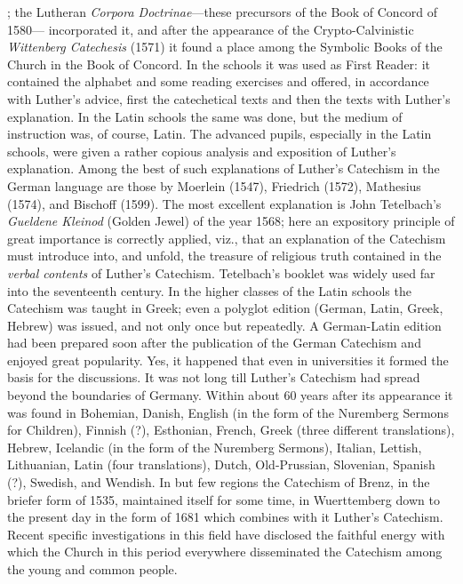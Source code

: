 ; the Lutheran \emph{Corpora Doctrinae}—these precursors of the Book of Concord of 1580— incorporated it, and after the appearance of the Crypto-Calvinistic \emph{Wittenberg Catechesis} (1571) it found a place among the Symbolic Books of the Church in the Book of Concord. In the schools it was used as First Reader: it contained the alphabet and some reading exercises and offered, in accordance with Luther’s advice, first the catechetical texts and then the texts with Luther’s explanation. In the Latin schools the same was done, but the medium of instruction was, of course, Latin. The advanced pupils, especially in the Latin schools, were given a rather copious analysis and exposition of Luther’s explanation. Among the best of such explanations of Luther’s Catechism in the German language are those by Moerlein (1547), Friedrich (1572), Mathesius (1574), and Bischoff (1599). The most excellent explanation is John Tetelbach’s \emph{Gueldene Kleinod} (Golden Jewel) of the year 1568; here an expository principle of great importance is correctly applied, viz., that an explanation of the Catechism must introduce into, and unfold, the treasure of religious truth contained in the \emph{verbal contents} of Luther’s Catechism. Tetelbach’s booklet was widely used far into the seventeenth century. In the higher classes of the Latin schools the Catechism was taught in Greek; even a polyglot edition (German, Latin, Greek, Hebrew) was issued, and not only once but repeatedly. A German-Latin edition had been prepared soon after the publication of the German Catechism and enjoyed great popularity. Yes, it happened that even in universities it formed the basis for the discussions. It was not long till Luther’s Catechism had spread beyond the boundaries of Germany. Within about 60 years after its appearance it was found in Bohemian, Danish, English (in the form of the Nuremberg Sermons for Children), Finnish (?), Esthonian, French, Greek (three different translations), Hebrew, Icelandic (in
the form of the Nuremberg Sermons), Italian, Lettish, Lithuanian, Latin (four translations), Dutch, Old-Prussian, Slovenian, Spanish (?), Swedish, and Wendish. In but few regions the Catechism of Brenz, in the briefer form of 1535, maintained itself for some time, in Wuerttemberg down to the present day in the form of 1681 which combines with it Luther’s Catechism. Recent specific investigations in this field have disclosed the faithful energy with which the Church in this period everywhere disseminated the Catechism among the young and common people.

